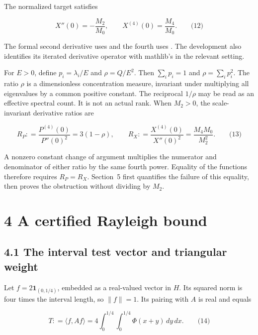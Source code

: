 \documentclass[
  11pt,
]{article}
\begin{document}
The normalized target satisfies

\[X''(0) = - \frac{M_{2}}{M_{0}},\quad\quad X^{(4)}(0) = \frac{M_{4}}{M_{0}}.\quad\quad\text{(12)}\]

The formal second derivative uses \texttt{} and the fourth uses \texttt{}. The development also identifies its iterated derivative operator with mathlib's \texttt{} in the relevant setting.

For \(E > 0\), define \(p_{i} = \lambda_{i}/E\) and \(\rho = Q/E^{2}\). Then \(\sum_{i}^{}p_{i} = 1\) and \(\rho = \sum_{i}^{}p_{i}^{2}\). The ratio \(\rho\) is a dimensionless concentration measure, invariant under multiplying all eigenvalues by a common positive constant. The reciprocal \(1/\rho\) may be read as an effective spectral count. It is not an actual rank. When \(M_{2} > 0\), the scale-invariant derivative ratios are

\[R_{P}: = \frac{P^{(4)}(0)}{P''(0)^{2}} = 3(1 - \rho),\quad\quad R_{X}: = \frac{X^{(4)}(0)}{X''(0)^{2}} = \frac{M_{4}M_{0}}{M_{2}^{2}}.\quad\quad\text{(13)}\]

A nonzero constant change of argument multiplies the numerator and denominator of either ratio by the same fourth power. Equality of the functions therefore requires \(R_{P} = R_{X}\). Section~5 first quantifies the failure of this equality, then proves the obstruction without dividing by \(M_{2}\).

\hypertarget{a-certified-rayleigh-bound}{%
\section{4 A certified Rayleigh bound}\label{a-certified-rayleigh-bound}}

\hypertarget{the-interval-test-vector-and-triangular-weight}{%
\subsection{4.1 The interval test vector and triangular weight}\label{the-interval-test-vector-and-triangular-weight}}

Let \(f = 2\mathbf{1}_{(0,1/4)}\), embedded as a real-valued vector in \(H\). Its squared norm is four times the interval length, so \(\parallel f \parallel = 1\). Its pairing with \(A\) is real and equals

\[T: = \langle f,Af\rangle = 4\int_{0}^{1/4}{\int_{0}^{1/4}\Phi}(x + y)\, dy\, dx.\quad\quad\text{(14)}\]
\end{document}
